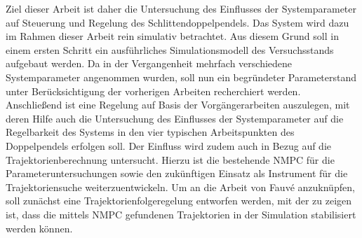 Ziel dieser Arbeit ist daher die Untersuchung des Einflusses der Systemparameter auf Steuerung und Regelung des Schlittendoppelpendels. Das System wird dazu im Rahmen dieser Arbeit rein simulativ betrachtet. Aus diesem Grund soll in einem ersten Schritt ein ausführliches Simulationsmodell des Versuchsstands aufgebaut werden. Da in der Vergangenheit mehrfach verschiedene Systemparameter angenommen wurden, soll nun ein begründeter Parameterstand unter Berücksichtigung der vorherigen Arbeiten recherchiert werden. Anschließend ist eine Regelung auf Basis der Vorgängerarbeiten auszulegen, mit deren Hilfe auch die Untersuchung des Einflusses der Systemparameter auf die Regelbarkeit des Systems in den vier typischen Arbeitspunkten des Doppelpendels erfolgen soll. Der Einfluss wird zudem auch in Bezug auf die Trajektorienberechnung untersucht. Hierzu ist die bestehende NMPC für die Parameteruntersuchungen sowie den zukünftigen Einsatz als Instrument für die Trajektoriensuche weiterzuentwickeln. Um an die Arbeit von Fauvé \cite{fauve} anzuknüpfen, soll zunächst eine Trajektorienfolgeregelung entworfen werden, mit der zu zeigen ist, dass die mittels NMPC gefundenen Trajektorien in der Simulation stabilisiert werden können. 
